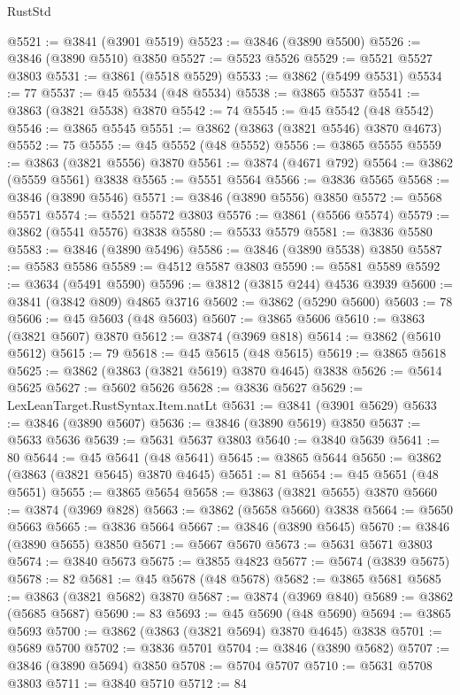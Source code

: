 \begin{lexlean}{RustStd}
\begin{coremodule}
@5521 := @3841 (@3901 @5519)
@5523 := @3846 (@3890 @5500)
@5526 := @3846 (@3890 @5510) @3850
@5527 := @5523 @5526
@5529 := @5521 @5527 @3803
@5531 := @3861 (@5518 @5529)
@5533 := @3862 (@5499 @5531)
@5534 := 77
@5537 := @45 @5534 (@48 @5534)
@5538 := @3865 @5537
@5541 := @3863 (@3821 @5538) @3870
@5542 := 74
@5545 := @45 @5542 (@48 @5542)
@5546 := @3865 @5545
@5551 := @3862 (@3863 (@3821 @5546) @3870 @4673)
@5552 := 75
@5555 := @45 @5552 (@48 @5552)
@5556 := @3865 @5555
@5559 := @3863 (@3821 @5556) @3870
@5561 := @3874 (@4671 @792)
@5564 := @3862 (@5559 @5561) @3838
@5565 := @5551 @5564
@5566 := @3836 @5565
@5568 := @3846 (@3890 @5546)
@5571 := @3846 (@3890 @5556) @3850
@5572 := @5568 @5571
@5574 := @5521 @5572 @3803
@5576 := @3861 (@5566 @5574)
@5579 := @3862 (@5541 @5576) @3838
@5580 := @5533 @5579
@5581 := @3836 @5580
@5583 := @3846 (@3890 @5496)
@5586 := @3846 (@3890 @5538) @3850
@5587 := @5583 @5586
@5589 := @4512 @5587 @3803
@5590 := @5581 @5589
@5592 := @3634 (@5491 @5590)
@5596 := @3812 (@3815 @244) @4536 @3939
@5600 := @3841 (@3842 @809) @4865 @3716
@5602 := @3862 (@5290 @5600)
@5603 := 78
@5606 := @45 @5603 (@48 @5603)
@5607 := @3865 @5606
@5610 := @3863 (@3821 @5607) @3870
@5612 := @3874 (@3969 @818)
@5614 := @3862 (@5610 @5612)
@5615 := 79
@5618 := @45 @5615 (@48 @5615)
@5619 := @3865 @5618
@5625 := @3862 (@3863 (@3821 @5619) @3870 @4645) @3838
@5626 := @5614 @5625
@5627 := @5602 @5626
@5628 := @3836 @5627
@5629 := LexLeanTarget.RustSyntax.Item.natLt
@5631 := @3841 (@3901 @5629)
@5633 := @3846 (@3890 @5607)
@5636 := @3846 (@3890 @5619) @3850
@5637 := @5633 @5636
@5639 := @5631 @5637 @3803
@5640 := @3840 @5639
@5641 := 80
@5644 := @45 @5641 (@48 @5641)
@5645 := @3865 @5644
@5650 := @3862 (@3863 (@3821 @5645) @3870 @4645)
@5651 := 81
@5654 := @45 @5651 (@48 @5651)
@5655 := @3865 @5654
@5658 := @3863 (@3821 @5655) @3870
@5660 := @3874 (@3969 @828)
@5663 := @3862 (@5658 @5660) @3838
@5664 := @5650 @5663
@5665 := @3836 @5664
@5667 := @3846 (@3890 @5645)
@5670 := @3846 (@3890 @5655) @3850
@5671 := @5667 @5670
@5673 := @5631 @5671 @3803
@5674 := @3840 @5673
@5675 := @3855 @4823
@5677 := @5674 (@3839 @5675)
@5678 := 82
@5681 := @45 @5678 (@48 @5678)
@5682 := @3865 @5681
@5685 := @3863 (@3821 @5682) @3870
@5687 := @3874 (@3969 @840)
@5689 := @3862 (@5685 @5687)
@5690 := 83
@5693 := @45 @5690 (@48 @5690)
@5694 := @3865 @5693
@5700 := @3862 (@3863 (@3821 @5694) @3870 @4645) @3838
@5701 := @5689 @5700
@5702 := @3836 @5701
@5704 := @3846 (@3890 @5682)
@5707 := @3846 (@3890 @5694) @3850
@5708 := @5704 @5707
@5710 := @5631 @5708 @3803
@5711 := @3840 @5710
@5712 := 84

\end{coremodule}
\end{lexlean}
